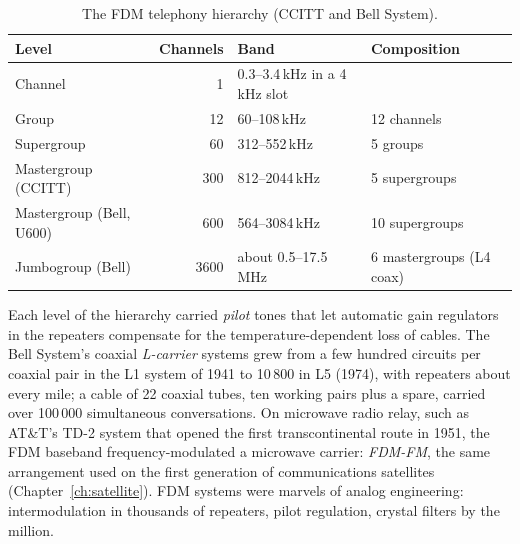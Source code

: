 
\begin{table}[htbp]\centering\small
\caption{The FDM telephony hierarchy (CCITT and Bell System).}
\label{tab:ch04:fdm}
\begin{tabular}{@{}lrll@{}}
\toprule
Level & Channels & Band & Composition \\
\midrule
Channel & 1 & 0.3--3.4\,kHz in a 4\,kHz slot & \\
Group & 12 & 60--108\,kHz & 12 channels \\
Supergroup & 60 & 312--552\,kHz & 5 groups \\
Mastergroup (CCITT) & 300 & 812--2044\,kHz & 5 supergroups \\
Mastergroup (Bell, U600) & 600 & 564--3084\,kHz & 10 supergroups \\
Jumbogroup (Bell) & 3600 & about 0.5--17.5\,MHz & 6 mastergroups (L4 coax) \\
\bottomrule
\end{tabular}
\end{table}

Each level of the hierarchy carried \emph{pilot} tones that let automatic gain regulators in the repeaters
compensate for the temperature-dependent loss of cables. The Bell System's coaxial \emph{L-carrier} systems
grew from a few hundred circuits per coaxial pair in the L1 system of 1941 to 10\,800 in L5 (1974), with
repeaters about every mile; a cable of 22 coaxial tubes, ten working pairs plus a spare, carried over 100\,000
simultaneous conversations. On microwave radio relay, such as AT\&T's TD-2 system that opened the first
transcontinental route in 1951, the FDM baseband frequency-modulated a microwave carrier: \emph{FDM-FM}, the
same arrangement used on the first generation of communications satellites (Chapter~\ref{ch:satellite}). FDM
systems were marvels of analog engineering: intermodulation in thousands of repeaters, pilot regulation,
crystal filters by the million.

